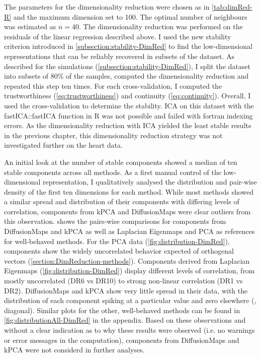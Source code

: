The parameters for the dimensionality reduction were chosen as in \cref{tab:dimRed-R} and the maximum dimension set to \num{100}. The optimal number of neighbours was estimated as \(n=40\).  The dimensionality reduction was performed on the residuals of the linear regression described above. I used the new stability criterion introduced in \cref{subsection:stability-DimRed} to find the low-dimensional representations that can be reliably recovered in subsets of the dataset. 
As described for the simulations (\cref{subsection:stability-DimRed}), I split the dataset into subsets of \num{80}\% of the samples, computed the dimensionality reduction and repeated this step ten times. For each cross-validation, I computed the trustworthiness (\cref{eq:trustworthiness}) and continuity (\cref{eq:continuity}). Overall, I used the cross-validation to determine the stability. ICA on this dataset with the fastICA::fastICA function in R was not possible and failed with fortran indexing errors. As the dimensionality reduction with ICA yielded the least stable results in the previous chapter, this dimensionality reduction strategy was not investigated further on the heart data.  

An initial look at the number of stable components showed a median of ten stable components across all methods. As a first manual control of the low-dimensional representation, I qualitatively analysed the distribution and pair-wise density of the first ten dimensions for each method. While most methods showed a similar spread and distribution of their components with differing levels of correlation, components from kPCA and DiffusionMaps were clear outliers from this observation.  shows the pairs-wise comparisons for components from DiffusionMaps and kPCA as well as Laplacian Eigenmaps and PCA as references for well-behaved methods. For the PCA data (\cref{fig:distribution-DimRed}), components show the widely uncorrelated behavior expected of orthogenal vectors (\cref{section:DimReduction-methods}). Components derived from Laplacian Eigenmaps (\cref{fig:distribution-DimRed}) display different levels of correlation, from mostly uncorrelated (DR6 vs DR10) to strong non-linear correlation (DR1 vs DR2). DiffusionMaps and kPCA show very little spread in their data, with the distribution of each component spiking at a particular value and zero  elsewhere (, diagonal). Similar plots for the other, well-behaved methods can be found in \cref{fig:distributionAll-DimRed} in the appendix. Based on these observations and without a clear indication as to why these results were observed (i.e. no warnings or error messages in the computation), components from DiffusionMaps and kPCA were not considerd in further analyses. 

